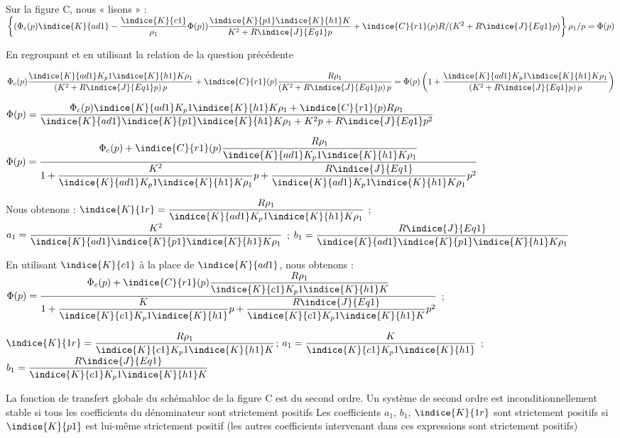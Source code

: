 \ifprof
\begin{corrige}
Sur la figure C, nous « lisons » :
$\left\{(\Phi_c (p)  \indice{K}{ad1} -\dfrac{\indice{K}{c1} }{\rho_1 }  \Phi (p))   \dfrac{\indice{K}{p1} \indice{K}{h1}   K }{K^2+R  \indice{J}{Eq1}   p }+\indice{C}{r1}  (p)R/(K^2+R  \indice{J}{Eq1}   p )\right\}   \rho_1/p=\Phi(p)$

En regroupant et en utilisant la relation de la question précédente

$\Phi_c (p)   \dfrac{\indice{K}{ad1}   K _p1    \indice{K}{h1}  K  \rho_1}{\left(K^2+R  \indice{J}{Eq1}   p \right) p} +\indice{C}{r1}(p) \dfrac{R  \rho_1}{\left(K^2+R  \indice{J}{Eq1}   p \right) p} 
=\Phi(p)\left(1+\dfrac{\indice{K}{ad1}   K _p1    \indice{K}{h1}  K  \rho_1}{\left(K^2+R  \indice{J}{Eq1}   p \right) p} \right)$

$\Phi(p)=\dfrac{\Phi_c (p)  \indice{K}{ad1}   K _p1    \indice{K}{h1}  K  \rho_1+\indice{C}{r1}  (p) R  \rho_1}{\indice{K}{ad1}   \indice{K}{p1}    \indice{K}{h1}  K  \rho_1+K^2 p +R  \indice{J}{Eq1}    p ^2 }$

$\Phi(p)=  \dfrac{\Phi_c (p)+\indice{C}{r1}  (p)   \dfrac{R  \rho_1}{\indice{K}{ad1}   K _p1    \indice{K}{h1}  K  \rho_1 }}{1+\dfrac{K^2}{\indice{K}{ad1}   K _p1    \indice{K}{h1}  K  \rho_1 } p +\dfrac{R  \indice{J}{Eq1} }{\indice{K}{ad1}   K _p1    \indice{K}{h1}  K  \rho_1 }   p ^2 }$
 
Nous obtenons : $\indice{K}{1r}=  \dfrac{R  \rho_1}{\indice{K}{ad1}   K _p1    \indice{K}{h1}  K  \rho_1 }$ ; 
$a_1=  \dfrac{K^2}{\indice{K}{ad1}   \indice{K}{p1}    \indice{K}{h1}  K  \rho_1}$ ; 
$b_1=  \dfrac{R  \indice{J}{Eq1} }{\indice{K}{ad1}   \indice{K}{p1}    \indice{K}{h1}  K  \rho_1 }$

En utilisant $\indice{K}{c1}$   à la place de $\indice{K}{ad1}$, nous obtenons : 
$\Phi(p)=  \dfrac{\Phi_c (p)+\indice{C}{r1}  (p)   \dfrac{R  \rho_1}{\indice{K}{c1}   K _p1    \indice{K}{h1}  K }}{1+\dfrac{K}{\indice{K}{c1}   K _p1    \indice{K}{h1}  } p +\dfrac{R  \indice{J}{Eq1} }{\indice{K}{c1}   K _p1    \indice{K}{h1}  K }   p ^2 }$ ;

$\indice{K}{1r}=  \dfrac{R  \rho_1}{\indice{K}{c1}   K _p1    \indice{K}{h1}  K }$; 
$a_1=  \dfrac{K}{\indice{K}{c1}   K _p1    \indice{K}{h1} }$ ; 
$b_1=  \dfrac{R  \indice{J}{Eq1} }{\indice{K}{c1}   K _p1    \indice{K}{h1}  K }$

La fonction de transfert globale du schémabloc de la figure C est du second ordre. Un système de second ordre est inconditionnellement stable si tous les coefficients du dénominateur sont strictement positifs Les coefficients $a_1$, $b_1$, $\indice{K}{1r}$ sont strictement positifs si $\indice{K}{p1}$  est lui-même strictement positif (les autres coefficients intervenant dans ces expressions sont strictement positifs)

\end{corrige}
\else
\fi

